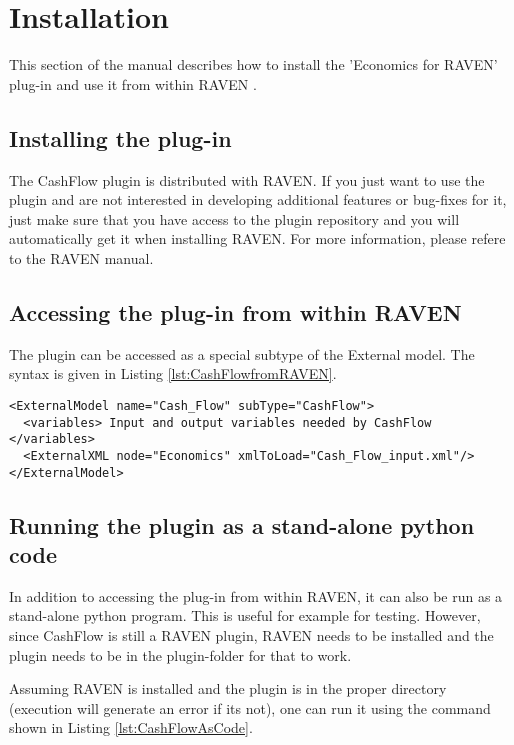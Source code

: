 
\section{Installation}
\label{sec:Installation}

This section of the manual describes how to install the 'Economics for RAVEN'  plug-in and use it from within RAVEN \cite{RAVEN}.

\subsection{Installing the plug-in}
The CashFlow plugin is distributed with RAVEN. If you just want to use the plugin and are not interested in developing additional features or bug-fixes for it, just make sure that you have access to the plugin repository and you will automatically get it when installing RAVEN.
For more information, please refere to the RAVEN manual.

\subsection{Accessing the plug-in from within RAVEN}
The plugin can be accessed as a special subtype of the External model. The syntax is given in Listing \ref{lst:CashFlowfromRAVEN}.

\begin{lstlisting}[style=XML,morekeywords={anAttribute},caption=Call CashFlow from RAVEN input., label=lst:CashFlowfromRAVEN]
<ExternalModel name="Cash_Flow" subType="CashFlow">
  <variables> Input and output variables needed by CashFlow  </variables>
  <ExternalXML node="Economics" xmlToLoad="Cash_Flow_input.xml"/>
</ExternalModel>
\end{lstlisting}

\subsection{Running the plugin as a stand-alone python code}

In addition to accessing the plug-in from within RAVEN, it can also be run as a stand-alone python program. This is useful for example for testing. However, since CashFlow is still a RAVEN plugin, RAVEN needs to be installed and the plugin needs to be in the plugin-folder for that to work.

Assuming RAVEN is installed and the plugin is in the proper directory (execution will generate an error if its not), one can run it using the command shown in Listing \ref{lst:CashFlowAsCode}.

